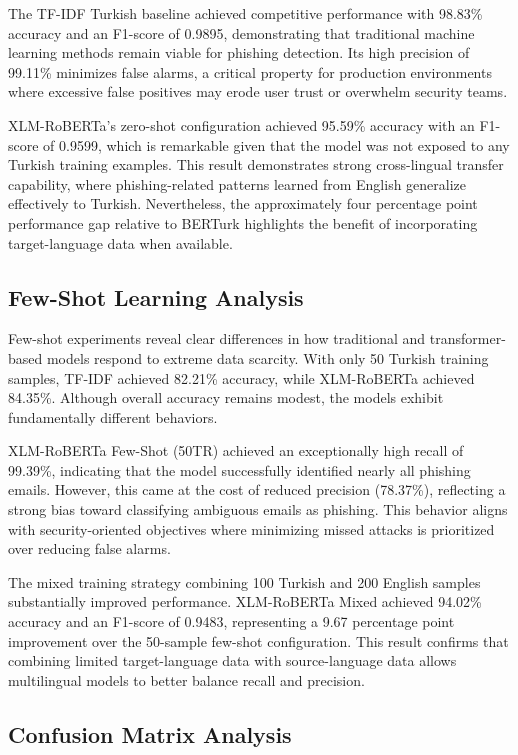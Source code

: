 \documentclass[conference]{IEEEtran}
\begin{document}
The TF-IDF Turkish baseline achieved competitive performance with 98.83\% accuracy and an F1-score of 0.9895, demonstrating that traditional machine learning methods remain viable for phishing detection. Its high precision of 99.11\% minimizes false alarms, a critical property for production environments where excessive false positives may erode user trust or overwhelm security teams.

XLM-RoBERTa’s zero-shot configuration achieved 95.59\% accuracy with an F1-score of 0.9599, which is remarkable given that the model was not exposed to any Turkish training examples. This result demonstrates strong cross-lingual transfer capability, where phishing-related patterns learned from English generalize effectively to Turkish. Nevertheless, the approximately four percentage point performance gap relative to BERTurk highlights the benefit of incorporating target-language data when available.

\subsection{Few-Shot Learning Analysis}

Few-shot experiments reveal clear differences in how traditional and transformer-based models respond to extreme data scarcity. With only 50 Turkish training samples, TF-IDF achieved 82.21\% accuracy, while XLM-RoBERTa achieved 84.35\%. Although overall accuracy remains modest, the models exhibit fundamentally different behaviors.

XLM-RoBERTa Few-Shot (50TR) achieved an exceptionally high recall of 99.39\%, indicating that the model successfully identified nearly all phishing emails. However, this came at the cost of reduced precision (78.37\%), reflecting a strong bias toward classifying ambiguous emails as phishing. This behavior aligns with security-oriented objectives where minimizing missed attacks is prioritized over reducing false alarms.

The mixed training strategy combining 100 Turkish and 200 English samples substantially improved performance. XLM-RoBERTa Mixed achieved 94.02\% accuracy and an F1-score of 0.9483, representing a 9.67 percentage point improvement over the 50-sample few-shot configuration. This result confirms that combining limited target-language data with source-language data allows multilingual models to better balance recall and precision.

\subsection{Confusion Matrix Analysis}
\end{document}
